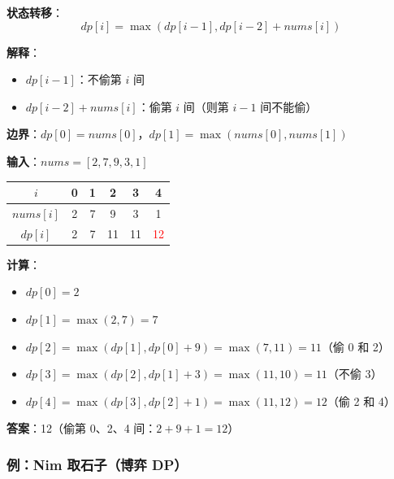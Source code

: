 \documentclass[12pt, a4paper]{ctexart}
\begin{document}
\begin{blackboard}[打家劫舍状态转移]

\textbf{状态转移}：
\[
dp[i] = \max(dp[i-1], dp[i-2] + nums[i])
\]

\textbf{解释}：
\begin{itemize}
    \item $dp[i-1]$：不偷第 $i$ 间
    \item $dp[i-2] + nums[i]$：偷第 $i$ 间（则第 $i-1$ 间不能偷）
\end{itemize}

\textbf{边界}：$dp[0] = nums[0]$，$dp[1] = \max(nums[0], nums[1])$

\end{blackboard}

\begin{blackboard}[打家劫舍手算]

\textbf{输入}：$nums = [2, 7, 9, 3, 1]$

\begin{center}
\begin{tabular}{c|ccccc}
$i$ & 0 & 1 & 2 & 3 & 4 \\
\hline
$nums[i]$ & 2 & 7 & 9 & 3 & 1 \\
$dp[i]$ & 2 & 7 & 11 & 11 & \textcolor{red}{12} \\
\end{tabular}
\end{center}

\textbf{计算}：
\begin{itemize}
    \item $dp[0] = 2$
    \item $dp[1] = \max(2, 7) = 7$
    \item $dp[2] = \max(dp[1], dp[0] + 9) = \max(7, 11) = 11$（偷 0 和 2）
    \item $dp[3] = \max(dp[2], dp[1] + 3) = \max(11, 10) = 11$（不偷 3）
    \item $dp[4] = \max(dp[3], dp[2] + 1) = \max(11, 12) = 12$（偷 2 和 4）
\end{itemize}

\textbf{答案}：12（偷第 0、2、4 间：$2 + 9 + 1 = 12$）

\end{blackboard}

\subsubsection{例：Nim 取石子（博弈 DP）}
\end{document}
